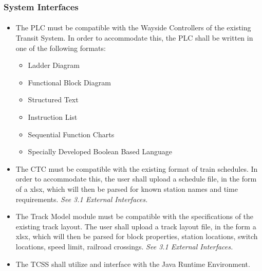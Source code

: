 \documentclass{article}
\begin{document}
    \subsubsection{System Interfaces}
    \paragraph{}
    
    
    \begin{itemize}
        \item The PLC  must be compatible with the Wayside Controllers of the existing Transit System. In order to accommodate this, the PLC  shall be written in one of the following formats:
        \begin{itemize}
            \item Ladder Diagram 
            \item Functional Block Diagram
            \item Structured Text
            \item Instruction List
            \item Sequential Function Charts
            \item Specially Developed Boolean Based Language
        \end{itemize}
    \item The CTC  must be compatible with the existing format of train schedules. In order to accommodate this, the user shall upload a schedule file, in the form of a xlsx, which will then be parsed for known station names and time requirements. \emph{See 3.1 External Interfaces.} 
    \item The Track Model  module must be compatible with the specifications of the existing track layout. The user shall upload a track layout file, in the form a xlsx, which will then be parsed for block properties, station locations, switch locations, speed limit, railroad crossings. \emph{See 3.1 External Interfaces.}
    \item The TCSS shall utilize and interface  with the Java Runtime Environment.
    \end{itemize}
\end{document}
